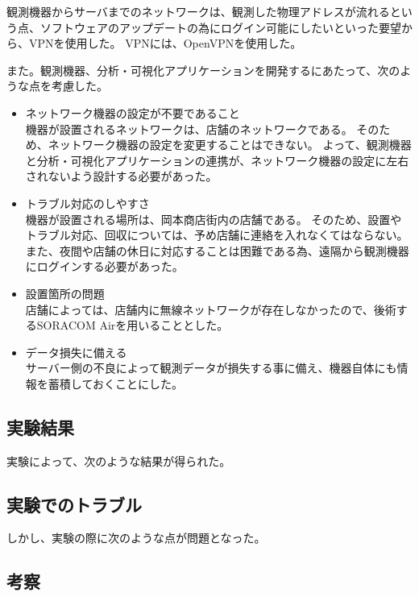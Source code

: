 観測機器からサーバまでのネットワークは、観測した物理アドレスが流れるという点、ソフトウェアのアップデートの為にログイン可能にしたいといった要望から、VPNを使用した。
VPNには、OpenVPNを使用した。

また。観測機器、分析・可視化アプリケーションを開発するにあたって、次のような点を考慮した。
\begin{itemize}
\item ネットワーク機器の設定が不要であること\\
	機器が設置されるネットワークは、店舗のネットワークである。
	そのため、ネットワーク機器の設定を変更することはできない。
	よって、観測機器と分析・可視化アプリケーションの連携が、ネットワーク機器の設定に左右されないよう設計する必要があった。
\item トラブル対応のしやすさ\\
	機器が設置される場所は、岡本商店街内の店舗である。
	そのため、設置やトラブル対応、回収については、予め店舗に連絡を入れなくてはならない。
	また、夜間や店舗の休日に対応することは困難である為、遠隔から観測機器にログインする必要があった。
\item 設置箇所の問題\\
	店舗によっては、店舗内に無線ネットワークが存在しなかったので、後術するSORACOM Airを用いることとした。
\item データ損失に備える\\
	サーバー側の不良によって観測データが損失する事に備え、機器自体にも情報を蓄積しておくことにした。
\end{itemize}

\subsection{実験結果}
実験によって、次のような結果が得られた。


\subsection{実験でのトラブル}
しかし、実験の際に次のような点が問題となった。


\subsection{考察}













